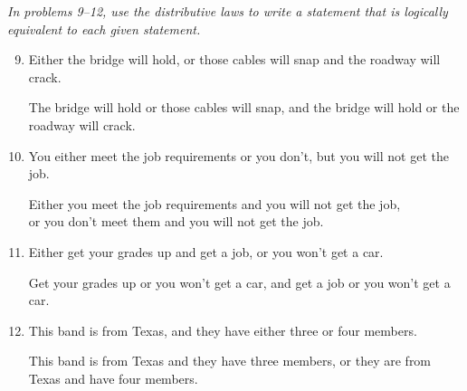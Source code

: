 \emph{In problems 9--12, use the distributive laws to write a statement that is logically equivalent to each given statement.}
\begin{enumerate}
\setcounter{enumi}{8}

\item Either the bridge will hold, or those cables will snap and the roadway will crack. \\ 
\begin{framed}
The bridge will hold or those cables will snap, and the bridge will hold or the roadway will crack.
\end{framed}

\item You either meet the job requirements or you don't, but you will not get the job.\\ 
\begin{framed}
Either you meet the job requirements and you will not get the job,\\ or you don't meet them and you will not get the job.
\end{framed}

\item Either get your grades up and get a job, or you won't get a car. \\ 
\begin{framed}
Get your grades up or you won't get a car, and get a job or you won't get a car.
\end{framed}

\item This band is from Texas, and they have either three or four members. \\ 
\begin{framed}
This band is from Texas and they have three members, or they are from Texas and have four members.
\end{framed}
\end{enumerate}

